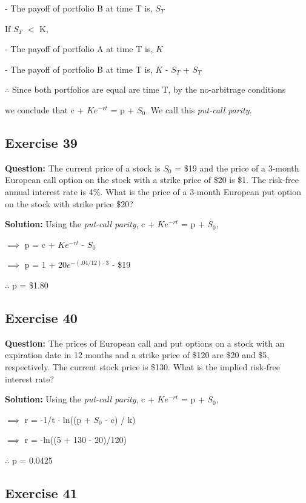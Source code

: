 \documentclass{article}
\begin{document}
- The payoff of portfolio B at time T is, $S_T$

\vspace{\baselineskip}

If $S_T$ $<$ K,

- The payoff of portfolio A at time T is, $K$

- The payoff of portfolio B at time T is, $K$ - $S_T$ + $S_T$

$\therefore$ Since both portfolios are equal are time T,  by the no-arbitrage conditions 

we conclude that c + $Ke^{-rt}$ = p + $S_0$. We call this \textit{put-call parity}.

\subsection*{Exercise 39}

\textbf{Question:} The current price of a stock is $S_0$ = \$19 and the price of a 3-month European call option on the
stock with a strike price of \$20 is \$1. The risk-free annual interest rate is 4\%. What is the price of a 3-month
European put option on the stock with strike price \$20?
 
\textbf{Solution:}
Using the \textit{put-call parity}, c + $Ke^{-rt}$ = p + $S_0$,

$\implies$ p = c + $Ke^{-rt}$ - $S_0$

$\implies$ p = 1 + 20$e^{-(.04/12) \cdot 3}$ - \$19

$\therefore$ p  = \$1.80

\subsection*{Exercise 40}

\textbf{Question:} The prices of European call and put options on a stock with an expiration date in 12 months and
a strike price of \$120 are \$20 and \$5, respectively. The current stock price is \$130. What is the implied risk-free
interest rate?
 
\textbf{Solution:}
Using the \textit{put-call parity}, c + $Ke^{-rt}$ = p + $S_0$,

$\implies$ r = -1/t $\cdot$ ln((p + $S_0$ - c) / k)

$\implies$ r = -ln((5 + 130 - 20)/120)

$\therefore$ p  = 0.0425 

\subsection*{Exercise 41}
\end{document}

